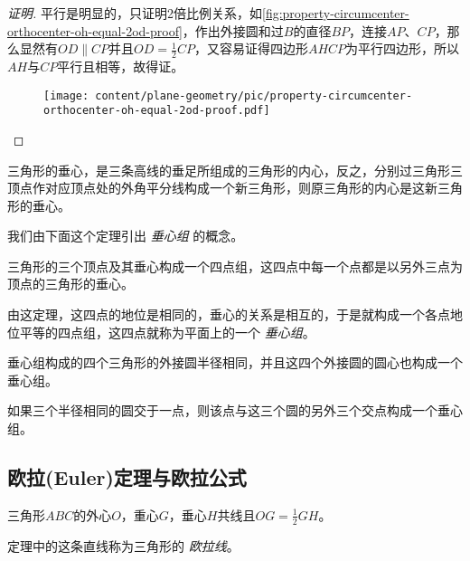 \begin{proof}[证明]
  平行是明显的，只证明2倍比例关系，如\autoref{fig:property-circumcenter-orthocenter-oh-equal-2od-proof}，作出外接圆和过$B$的直径$BP$，连接$AP$、$CP$，那么显然有$OD \parallel CP$并且$OD=\frac{1}{2}CP$，又容易证得四边形$AHCP$为平行四边形，所以$AH$与$CP$平行且相等，故得证。

\begin{figure}[htbp]
\centering
\texttt{[image: content/plane-geometry/pic/property-circumcenter-orthocenter-oh-equal-2od-proof.pdf]}
\caption{}
\label{fig:property-circumcenter-orthocenter-oh-equal-2od-proof}
\end{figure}

\end{proof}

\begin{property}
  三角形的垂心，是三条高线的垂足所组成的三角形的内心，反之，分别过三角形三顶点作对应顶点处的外角平分线构成一个新三角形，则原三角形的内心是这新三角形的垂心。
\end{property}

我们由下面这个定理引出 \emph{垂心组} 的概念。
\begin{theorem}
  三角形的三个顶点及其垂心构成一个四点组，这四点中每一个点都是以另外三点为顶点的三角形的垂心。
\end{theorem}
由这定理，这四点的地位是相同的，垂心的关系是相互的，于是就构成一个各点地位平等的四点组，这四点就称为平面上的一个 \emph{垂心组}。

\begin{property}
  垂心组构成的四个三角形的外接圆半径相同，并且这四个外接圆的圆心也构成一个垂心组。
\end{property}

\begin{property}
  如果三个半径相同的圆交于一点，则该点与这三个圆的另外三个交点构成一个垂心组。
\end{property}

\subsection{欧拉(Euler)定理与欧拉公式}
\label{sec:euler-theorem-and-euler-formula}

\begin{theorem}[欧拉(Euler)定理]
  三角形$ABC$的外心$O$，重心$G$，垂心$H$共线且$OG=\frac{1}{2}GH$。
\end{theorem}

定理中的这条直线称为三角形的 \emph{欧拉线}。

